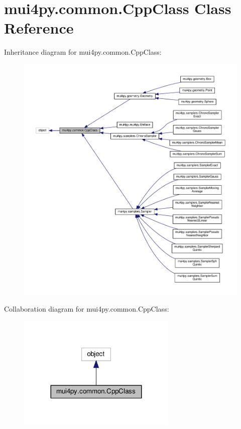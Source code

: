 \hypertarget{classmui4py_1_1common_1_1_cpp_class}{}\section{mui4py.\+common.\+Cpp\+Class Class Reference}
\label{classmui4py_1_1common_1_1_cpp_class}


Inheritance diagram for mui4py.\+common.\+Cpp\+Class\+:
\nopagebreak
\begin{figure}[H]
\begin{center}
\leavevmode
\includegraphics[width=350pt]{classmui4py_1_1common_1_1_cpp_class__inherit__graph}
\end{center}
\end{figure}


Collaboration diagram for mui4py.\+common.\+Cpp\+Class\+:
\nopagebreak
\begin{figure}[H]
\begin{center}
\leavevmode
\includegraphics[width=215pt]{classmui4py_1_1common_1_1_cpp_class__coll__graph}
\end{center}
\end{figure}
